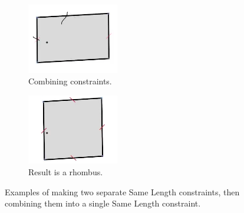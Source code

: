 \begin{figure}
  \vspace{5mm}
  \begin{subfigure}[t]{0.35\textwidth}
    \centering
    \includegraphics[width=40mm]{img/same-length-4.png}
    \caption{Combining constraints.}
    \label{fig:same-length-4}
  \end{subfigure}
  \hspace{1cm} %
  \begin{subfigure}[t]{0.35\textwidth}
    \centering
    \includegraphics[width=40mm]{img/same-length-5.png}
    \caption{Result is a rhombus.}
    \label{fig:same-length-5}
  \end{subfigure}

  \caption[Same Length constraints]{Examples of making two separate
    Same Length constraints, then combining them into a single Same
    Length constraint.}
  \label{fig:same-length}
\end{figure}
